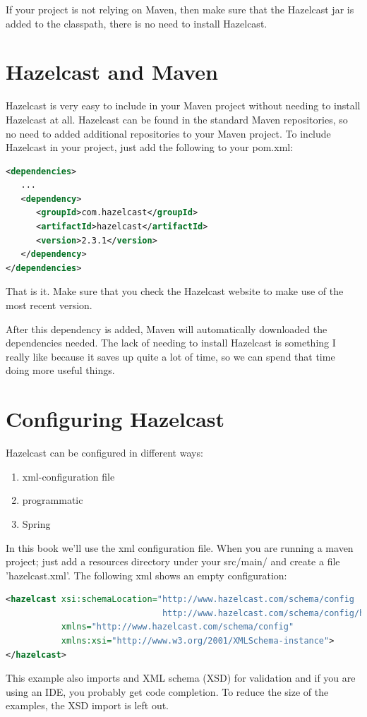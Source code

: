 If your project is not relying on Maven, then make sure that the Hazelcast jar is added to the classpath, there is no need to install Hazelcast.

\section{Hazelcast and Maven}
Hazelcast is very easy to include in your Maven project without needing to install Hazelcast at all. Hazelcast can be found in the standard Maven repositories, so no need to added additional repositories to your Maven project. To include Hazelcast in your project, just add the following to your pom.xml:
\begin{lstlisting}[language=xml]
<dependencies>	
   ...
   <dependency>
      <groupId>com.hazelcast</groupId>
      <artifactId>hazelcast</artifactId>
      <version>2.3.1</version>
   </dependency>
</dependencies>
\end{lstlisting}
That is it. Make sure that you check the Hazelcast website to make use of the most recent version. 

After this dependency is added, Maven will automatically downloaded the dependencies needed.  The lack of needing to install Hazelcast is something I really like because it saves up quite a lot of time, so we can spend that time doing more useful things.

\section{Configuring Hazelcast}
Hazelcast can be configured in different ways:
\begin{enumerate}
\item xml-configuration file
\item programmatic 
\item Spring
\end{enumerate}
In this book we'll use the xml configuration file. When you are running a maven project; just add a resources directory under your src/main/ and create a file 'hazelcast.xml'. The following xml shows an empty configuration:
\begin{lstlisting}[language=xml]
<hazelcast xsi:schemaLocation="http://www.hazelcast.com/schema/config
                               http://www.hazelcast.com/schema/config/hazelcast-config-2.5.xsd"
           xmlns="http://www.hazelcast.com/schema/config"
           xmlns:xsi="http://www.w3.org/2001/XMLSchema-instance">
</hazelcast>
\end{lstlisting}
This example also imports and XML schema (XSD) for validation and if you are using an IDE, you probably get code completion. To reduce the size of the examples, the XSD import is left out.

